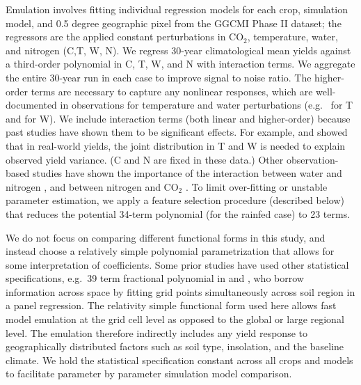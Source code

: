 \documentclass[gmd, manuscript]{copernicus} %
\begin{document}
Emulation involves fitting individual regression models for each crop, simulation model, and 0.5 degree geographic pixel from the GGCMI Phase II dataset; the regressors are the applied constant perturbations in CO$_2$, temperature, water, and nitrogen (C,T, W, N).  
We regress 30-year climatological mean yields against a third-order polynomial in C, T, W, and N with interaction terms. 
We aggregate the entire 30-year run in each case to improve signal to noise ratio. 
The higher-order terms are necessary to capture any nonlinear responses, which are well-documented in observations for temperature and water perturbations (e.g.\ \citet{Schlenker2009} for T and \citet{He2016} for W). 
We include interaction terms (both linear and higher-order) because past studies have shown them to be significant effects. 
For example, \citet{Lobell2007} and \citet{Tebaldi2008} showed that in real-world yields, the joint distribution in T and W is needed to explain observed yield variance. 
(C and N are fixed in these data.) 
Other observation-based studies have shown the importance of the interaction between water and nitrogen \citep[e.g.][]{AULAKH2005}, and between nitrogen and CO$_2$ \citep{Mitsuru92, Nakamura97}. 
To limit over-fitting or unstable parameter estimation, we apply a feature selection procedure (described below) that reduces the potential 34-term polynomial (for the rainfed case) to 23 terms.

We do not focus on comparing different functional forms in this study, and instead choose a relatively simple polynomial parametrization that allows for some interpretation of coefficients. 
Some prior studies have used other statistical specifications, e.g.\ 39 term fractional polynomial in \citet{BLANC2015} and \citet{BLANC2017}, who borrow information across space by fitting grid points simultaneously across soil region in a panel regression. 
The relativity simple functional form used here allows fast model emulation at the grid cell level as opposed to the global or large regional level. 
The emulation therefore indirectly includes any yield response to geographically distributed factors such as soil type, insolation, and the baseline climate. 
We hold the statistical specification constant across all crops and models to facilitate parameter by parameter simulation model comparison.

\end{document}
